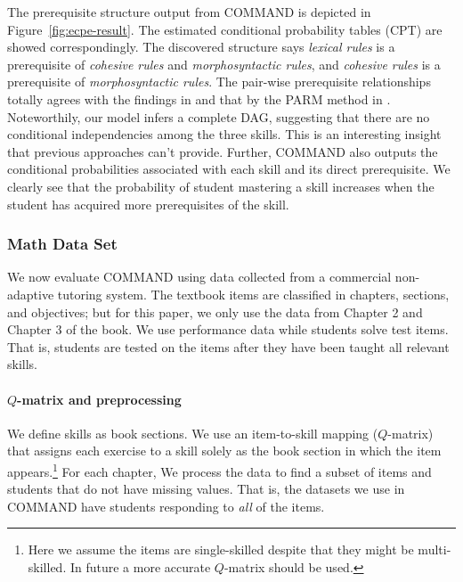 \documentclass{edm_template}
\begin{document}
	The prerequisite structure output from COMMAND is depicted in Figure~\ref{fig:ecpe-result}. The estimated conditional probability tables (CPT) are showed correspondingly.
	The discovered structure says \emph{lexical rules} is a prerequisite of \emph{cohesive rules} and \emph{morphosyntactic rules}, 
	and \emph{cohesive rules} is a prerequisite of \emph{morphosyntactic rules}. 
	The pair-wise prerequisite relationships totally agrees with the findings in \cite{templin2014hierarchical} and that by the PARM method in \cite{chen2015discovering}.
	Noteworthily, our model infers a complete DAG, suggesting that there are no conditional independencies among the three skills.
	This is an interesting insight that previous approaches can't provide.   
	Further, COMMAND also outputs the conditional probabilities associated with each skill and its direct prerequisite.
	We clearly see that the probability of student mastering a skill increases when the student has acquired more prerequisites of the skill.
	
	
	\subsubsection{Math Data Set}
	We now evaluate COMMAND using data collected from a commercial non-adaptive tutoring system.
	The textbook items are classified in chapters, sections, and objectives; but for this paper, we only use the data from Chapter 2 and Chapter 3 of the book.
	We use performance data while students solve test items. That is, students are tested on the items after they have been taught all relevant skills.
	
	\paragraph{$Q$-matrix and preprocessing}
	\label{sec:preprocessing}
	We define skills as book sections.
	We use an item-to-skill mapping ($Q$-matrix) that assigns each exercise to a skill solely as the book section in which the item appears.\footnote{Here we assume the items are single-skilled despite that they might be multi-skilled. In future a more accurate $Q$-matrix should be used.}
	For each chapter, We process the data to find a subset of items and students that do not have missing values.
	That is, the datasets we use in COMMAND have students responding to \textit{all} of the  items.
	
\end{document}
